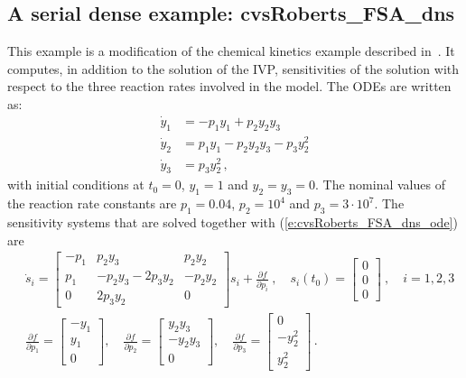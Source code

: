 

\subsection{A serial dense example: cvsRoberts\_FSA\_dns}
\label{ss:cvsRoberts_FSA_dns}

This example is a modification of the chemical kinetics example 
described in~\cite{cvode_ex}.  It computes, in addition to the solution of the
IVP, sensitivities of the solution with respect to the three reaction rates 
involved in the model. The ODEs are written as:
\begin{equation}\label{e:cvsRoberts_FSA_dns_ode}
  \begin{split}
    {\dot y}_1 &= -p_1 y_1 + p_2 y_2 y_3   \\
    {\dot y}_2 &=  p_1 y_1 - p_2 y_2 y_3 - p_3 y_2^2 \\
    {\dot y}_3 &=  p_3 y_2^2 \, ,
  \end{split}
\end{equation}
with initial conditions at $t_0 = 0$, $y_1 = 1$ and $y_2 = y_3 = 0$. 
The nominal values of the reaction rate constants are 
$p_1 = 0.04$, $p_2 = 10^4$ and $p_3 = 3\cdot 10^7$.
The sensitivity systems that are solved together with (\ref{e:cvsRoberts_FSA_dns_ode}) are
\begin{equation}\label{e:cvsRoberts_FSA_dns_sens}
  \begin{split}
    & {\dot s}_i = 
    \begin{bmatrix}
      - p_1 &   p_2 y_3             &   p_2 y_2 \\
        p_1 & - p_2 y_3 - 2 p_3 y_2 & - p_2 y_2 \\
        0   &             2 p_3 y_2 &  0              
    \end{bmatrix}
    s_i + \frac{\partial f}{\partial p_i} ~,
    \quad s_i(t_0) = \begin{bmatrix} 0 \\ 0 \\ 0 \end{bmatrix}  ~,
    \quad i = 1,2,3 \\
    & \frac{\partial f}{\partial p_1} = \begin{bmatrix} -y_1 \\ y_1 \\ 0 \end{bmatrix}, \quad
    \frac{\partial f}{\partial p_2} = \begin{bmatrix} y_2 y_3 \\ -y_2 y_3 \\ 0 \end{bmatrix}, \quad
    \frac{\partial f}{\partial p_3} = \begin{bmatrix} 0 \\ - y_2^2 \\ y_2^2 \end{bmatrix} \, .
  \end{split}
\end{equation}

